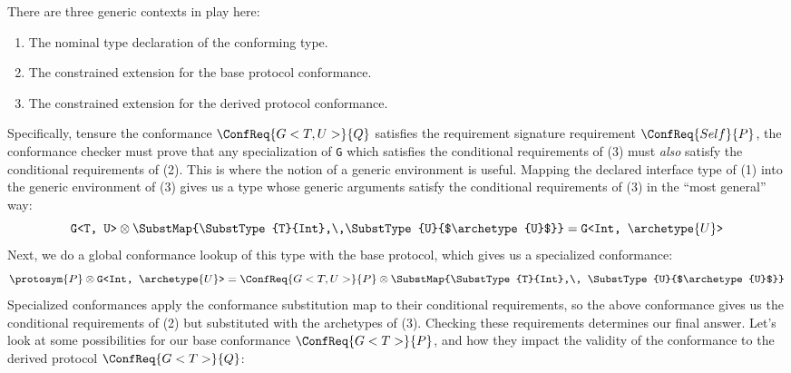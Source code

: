 \documentclass[../generics]{subfiles}
\begin{document}
There are three generic contexts in play here:
\begin{enumerate}
\item The nominal type declaration of the conforming type.
\item The constrained extension for the base protocol conformance.
\item The constrained extension for the derived protocol conformance.
\end{enumerate}
Specifically, tensure the conformance $\ConfReq{G<T, U>}{Q}$ satisfies the requirement signature requirement $\ConfReq{Self}{P}$, the conformance checker must prove that any specialization of \verb|G| which satisfies the conditional requirements of (3) must \emph{also} satisfy the conditional requirements of (2). This is where the notion of a generic environment is useful. Mapping the declared interface type of (1) into the generic environment of (3) gives us a type whose generic arguments satisfy the conditional requirements of (3) in the ``most general'' way:
\[\texttt{G<T, U>} \otimes \SubstMap{\SubstType{T}{Int},\,\SubstType{U}{$\archetype{U}$}} = \texttt{G<Int, $\archetype{U}$>}\]
Next, we do a global conformance lookup of this type with the base protocol, which gives us a specialized conformance:
\[\protosym{P}\otimes \texttt{G<Int, $\archetype{U}$>} = \ConfReq{G<T, U>}{P} \otimes \SubstMap{\SubstType{T}{Int},\,
\SubstType{U}{$\archetype{U}$}}\]
Specialized conformances apply the conformance substitution map to their conditional requirements, so the above conformance gives us the conditional requirements of (2) but substituted with the archetypes of (3). Checking these requirements determines our final answer. Let's look at some possibilities for our base conformance $\ConfReq{G<T>}{P}$, and how they impact the validity of the conformance to the derived protocol $\ConfReq{G<T>}{Q}$:
\end{document}
